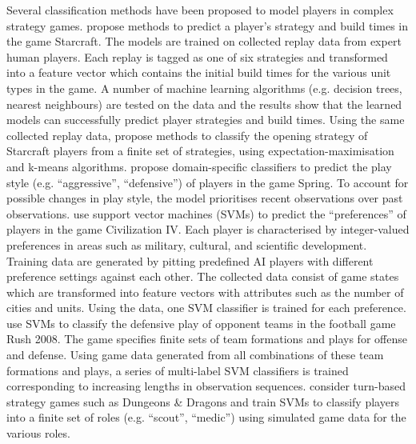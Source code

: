 \documentclass[final,1p,times,authoryear]{elsarticle}
\begin{document}
Several classification methods have been proposed to model players in complex strategy games. \citet{wm2009} propose methods to predict a player's strategy and build times in the game Starcraft. The models are trained on collected replay data from expert human players. Each replay is tagged as one of six strategies and transformed into a feature vector which contains the initial build times for the various unit types in the game. A number of machine learning algorithms (e.g. decision trees, nearest neighbours) are tested on the data and the results show that the learned models can successfully predict player strategies and build times. Using the same collected replay data, \citet{sb2011} propose methods to classify the opening strategy of Starcraft players from a finite set of strategies, using expectation-maximisation and k-means algorithms. \citet{sbp2007} propose domain-specific classifiers to predict the play style (e.g. ``aggressive'', ``defensive'') of players in the game Spring. To account for possible changes in play style, the model prioritises recent observations over past observations. \citet{st2010} use support vector machines (SVMs) \citep{cv1995svm} to predict the ``preferences'' of players in the game Civilization IV. Each player is characterised by integer-valued preferences in areas such as military, cultural, and scientific development. Training data are generated by pitting predefined AI players with different preference settings against each other. The collected data consist of game states which are transformed into feature vectors with attributes such as the number of cities and units. Using the data, one SVM classifier is trained for each preference. \citet{lsma2009} use SVMs to classify the defensive play of opponent teams in the football game Rush 2008. The game specifies finite sets of  team formations and plays for offense and defense. Using game data generated from all combinations of these team formations and plays, a series of multi-label SVM classifiers is trained corresponding to increasing lengths in observation sequences. \citet{ss2007} consider turn-based strategy games such as Dungeons \& Dragons and train SVMs to classify players into a finite set of roles (e.g. ``scout'', ``medic'') using simulated game data for the various roles.
\end{document}
